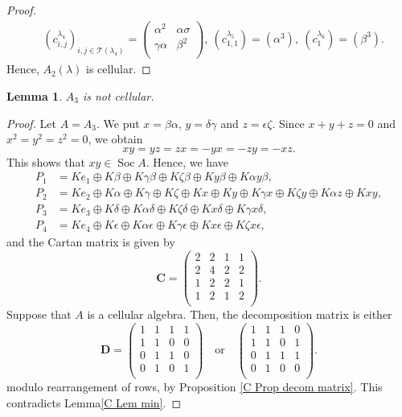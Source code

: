 \documentclass[12pt]{amsart}
\newtheorem{lem}[thm]{Lemma}
\numberwithin{equation}{thm}
\newcommand\bC{\mathbf C}
\newcommand\bD{\mathbf D}
\newcommand\cT{\mathcal{T}}
\newcommand\la{\lambda}
\newcommand\Soc{\operatorname{Soc}}
\begin{document}
{\begin{proof}
\begin{align*}
& (c_{i,j}^{\lambda_4})_{i,j\in \cT(\la_4)}
    =\begin{pmatrix}
    \alpha^2 & \alpha\sigma \\
    \gamma\alpha & \beta^2 \\
    \end{pmatrix},\ 
(c_{1,1}^{\lambda_5})
    =(\alpha^3),\ 
 (c_1^{\lambda_6})=(\beta^3).
 \end{align*}
Hence, $A_2(\la)$ is cellular.
\end{proof}
\begin{lem}
\label{P A3}
$A_3$ is not cellular.
\end{lem}
\begin{proof}
Let $A=A_3$. We put $x=\beta\alpha$, $y=\delta\gamma$ and $z=\epsilon\zeta$.
Since $x+y+z=0$ and $x^2=y^2=z^2=0$, we obtain
\[xy=yz=zx=-yx=-zy=-xz.\]
This shows that $xy\in \Soc A$. 
Hence, we have
\begin{align*}
P_1 &=
Ke_1\oplus K\beta\oplus K\gamma\beta\oplus K\zeta\beta\oplus Ky\beta\oplus K\alpha y \beta, \\
P_2 &=
Ke_2\oplus K\alpha\oplus K\gamma\oplus K\zeta\oplus Kx\oplus Ky\oplus 
K\gamma x\oplus K\zeta y\oplus K\alpha z\oplus Kxy, \\
P_3 &=
Ke_3\oplus K\delta\oplus K\alpha\delta\oplus K\zeta\delta\oplus Kx\delta\oplus K\gamma x \delta, \\
P_4 &=
Ke_4\oplus K\epsilon\oplus K\alpha\epsilon\oplus K\gamma\epsilon\oplus Kx\epsilon\oplus K\zeta x \epsilon,
\end{align*}
and the Cartan matrix is given by
\[\bC=
\begin{pmatrix}
2 & 2 & 1 & 1\\
2 & 4 & 2 & 2\\
1 & 2 & 2 & 1\\
1 & 2 & 1 & 2\\ 
\end{pmatrix}.
\]
 Suppose that $A$ is a cellular algebra. Then, the decomposition matrix is either
\[ \bD=\begin{pmatrix}
1 & 1 & 1 & 1\\
1 & 1 & 0 & 0\\
0 & 1 & 1 & 0\\
0 & 1 & 0 & 1\\ 
\end{pmatrix} \quad \text{or} \quad
\begin{pmatrix}
1 & 1 & 1 & 0\\
1 & 1 & 0 & 1\\
0 & 1 & 1 & 1\\
0 & 1 & 0 & 0\\ 
\end{pmatrix}.\] 
modulo rearrangement of rows, by Proposition \ref{C Prop decom matrix}.
This contradicts Lemma\;\ref{C Lem min}.
\end{proof}

}
\end{document}
